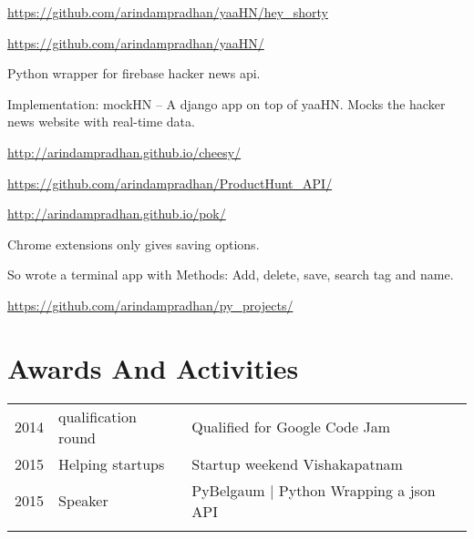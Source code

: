 \documentclass[]{deedy-resume-openfont}
\begin{document}
\begin{minipage}[t]{0.66\textwidth}
{ \url{https://github.com/arindampradhan/yaaHN/hey_shorty} }\\
\sectionsep

{ \url{https://github.com/arindampradhan/yaaHN/} }\\
\begin{tightemize}
\item Python wrapper for firebase hacker news api.\item Implementation: mockHN – A django app on top of yaaHN. Mocks the hacker news website with real-time data.\end{tightemize}
\sectionsep

{ \url{http://arindampradhan.github.io/cheesy/} }\\
\sectionsep

{ \url{https://github.com/arindampradhan/ProductHunt_API/} }\\
\sectionsep

{ \url{http://arindampradhan.github.io/pok/} }\\
\begin{tightemize}
\item Chrome extensions only gives saving options.\item So wrote a terminal app with Methods: Add, delete, save, search tag and name.\end{tightemize}
\sectionsep

{ \url{https://github.com/arindampradhan/py_projects/} }\\
\sectionsep



\section{Awards And Activities}
\begin{tabular}{rll}
2014         & qualification round  & Qualified for Google Code Jam\\
2015         & Helping startups     & Startup weekend Vishakapatnam\\
2015         & Speaker              & PyBelgaum | Python Wrapping a json API\\
\\
\end{tabular}
\sectionsep

\end{minipage}
\end{document}
